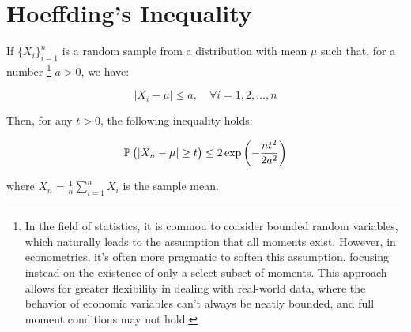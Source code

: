\section{Hoeffding's Inequality}

If $\{X_i\}_{i=1}^n$ is a random sample from a distribution with mean $\mu$ such that, for a number \footnote{In the field of statistics, it is common to consider bounded random variables, which naturally leads to the assumption that all moments exist. However, in econometrics, it's often more pragmatic to soften this assumption, focusing instead on the existence of only a select subset of moments. This approach allows for greater flexibility in dealing with real-world data, where the behavior of economic variables can't always be neatly bounded, and full moment conditions may not hold.} $a > 0$, we have:

\begin{equation*}
|X_i - \mu| \leq a, \quad \forall i = 1, 2, \ldots, n
\end{equation*}

Then, for any $t > 0$, the following inequality holds:

\begin{equation*}
\mathbb{P}\left(|\bar{X}_n - \mu| \geq t\right) \leq 2 \exp\left(-\frac{nt^2}{2 a^2}\right)
\end{equation*}

where $\bar{X}_n = \frac{1}{n} \sum_{i=1}^n X_i$ is the sample mean.

